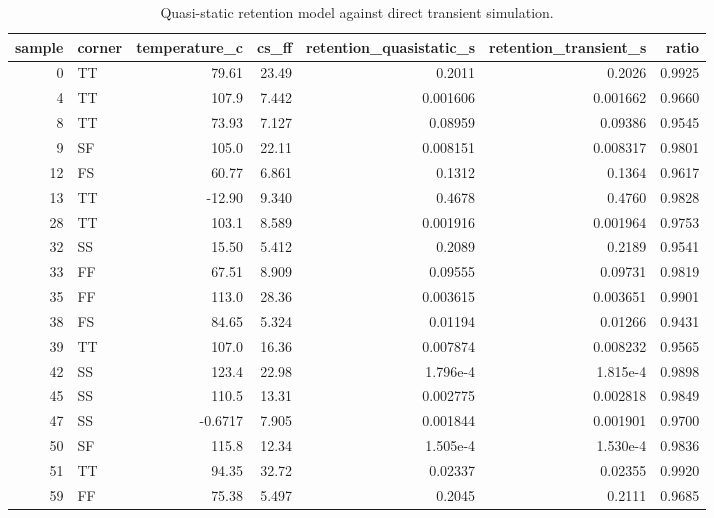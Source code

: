 \begin{table}[!t]
\centering
\caption{Quasi-static retention model against direct transient simulation.}
\label{tab:validation_retention_model}
\footnotesize
\begin{tabular}{rlrrrrr}
\toprule
sample & corner & temperature\_c & cs\_ff & retention\_quasistatic\_s & retention\_transient\_s & ratio \\
\midrule
0 & TT & 79.61 & 23.49 & 0.2011 & 0.2026 & 0.9925 \\
4 & TT & 107.9 & 7.442 & 0.001606 & 0.001662 & 0.9660 \\
8 & TT & 73.93 & 7.127 & 0.08959 & 0.09386 & 0.9545 \\
9 & SF & 105.0 & 22.11 & 0.008151 & 0.008317 & 0.9801 \\
12 & FS & 60.77 & 6.861 & 0.1312 & 0.1364 & 0.9617 \\
13 & TT & -12.90 & 9.340 & 0.4678 & 0.4760 & 0.9828 \\
28 & TT & 103.1 & 8.589 & 0.001916 & 0.001964 & 0.9753 \\
32 & SS & 15.50 & 5.412 & 0.2089 & 0.2189 & 0.9541 \\
33 & FF & 67.51 & 8.909 & 0.09555 & 0.09731 & 0.9819 \\
35 & FF & 113.0 & 28.36 & 0.003615 & 0.003651 & 0.9901 \\
38 & FS & 84.65 & 5.324 & 0.01194 & 0.01266 & 0.9431 \\
39 & TT & 107.0 & 16.36 & 0.007874 & 0.008232 & 0.9565 \\
42 & SS & 123.4 & 22.98 & 1.796e-4 & 1.815e-4 & 0.9898 \\
45 & SS & 110.5 & 13.31 & 0.002775 & 0.002818 & 0.9849 \\
47 & SS & -0.6717 & 7.905 & 0.001844 & 0.001901 & 0.9700 \\
50 & SF & 115.8 & 12.34 & 1.505e-4 & 1.530e-4 & 0.9836 \\
51 & TT & 94.35 & 32.72 & 0.02337 & 0.02355 & 0.9920 \\
59 & FF & 75.38 & 5.497 & 0.2045 & 0.2111 & 0.9685 \\
\bottomrule
\end{tabular}
\end{table}
